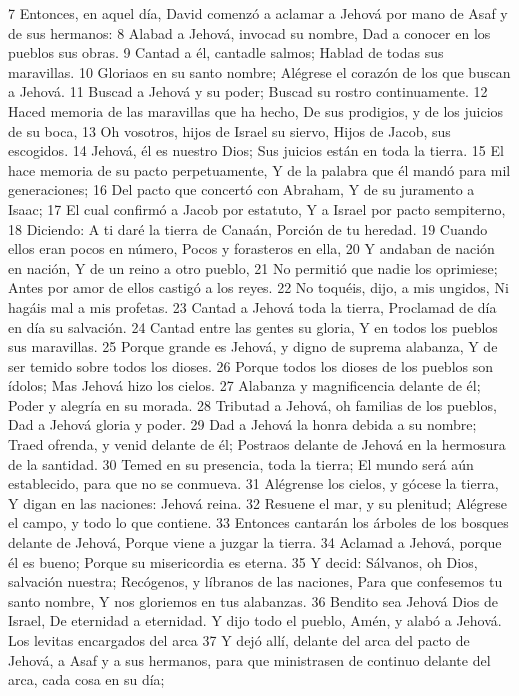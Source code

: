 7 Entonces, en aquel día, David comenzó a aclamar a Jehová por mano de Asaf y de sus hermanos:
8 Alabad a Jehová, invocad su nombre,
Dad a conocer en los pueblos sus obras.
9 Cantad a él, cantadle salmos;
Hablad de todas sus maravillas.
10 Gloriaos en su santo nombre;
Alégrese el corazón de los que buscan a Jehová. 
11 Buscad a Jehová y su poder;
Buscad su rostro continuamente.
12 Haced memoria de las maravillas que ha hecho, 
De sus prodigios, y de los juicios de su boca,
13 Oh vosotros, hijos de Israel su siervo,
Hijos de Jacob, sus escogidos. 
14 Jehová, él es nuestro Dios;
Sus juicios están en toda la tierra.
15 El hace memoria de su pacto perpetuamente,
Y de la palabra que él mandó para mil generaciones; 
16 Del pacto que concertó con Abraham, 
Y de su juramento a Isaac; 
17 El cual confirmó a Jacob por estatuto,
Y a Israel por pacto sempiterno,
18 Diciendo: A ti daré la tierra de Canaán,
Porción de tu heredad. 
19 Cuando ellos eran pocos en número,
Pocos y forasteros en ella,
20 Y andaban de nación en nación,
Y de un reino a otro pueblo,
21 No permitió que nadie los oprimiese;
Antes por amor de ellos castigó a los reyes. 
22 No toquéis, dijo, a mis ungidos,
Ni hagáis mal a mis profetas. 
23 Cantad a Jehová toda la tierra, 
Proclamad de día en día su salvación.
24 Cantad entre las gentes su gloria,
Y en todos los pueblos sus maravillas.
25 Porque grande es Jehová, y digno de suprema alabanza,
Y de ser temido sobre todos los dioses.
26 Porque todos los dioses de los pueblos son ídolos;
Mas Jehová hizo los cielos.
27 Alabanza y magnificencia delante de él;
Poder y alegría en su morada.
28 Tributad a Jehová, oh familias de los pueblos,
Dad a Jehová gloria y poder. 
29 Dad a Jehová la honra debida a su nombre;
Traed ofrenda, y venid delante de él;
Postraos delante de Jehová en la hermosura de la santidad. 
30 Temed en su presencia, toda la tierra;
El mundo será aún establecido, para que no se conmueva. 
31 Alégrense los cielos, y gócese la tierra,
Y digan en las naciones: Jehová reina.
32 Resuene el mar, y su plenitud;
Alégrese el campo, y todo lo que contiene.
33 Entonces cantarán los árboles de los bosques delante de Jehová,
Porque viene a juzgar la tierra.
34 Aclamad a Jehová, porque él es bueno;
Porque su misericordia es eterna. 
35 Y decid: Sálvanos, oh Dios, salvación nuestra;
Recógenos, y líbranos de las naciones,
Para que confesemos tu santo nombre,
Y nos gloriemos en tus alabanzas.
36 Bendito sea Jehová Dios de Israel,
De eternidad a eternidad.
Y dijo todo el pueblo, Amén, y alabó a Jehová.
Los levitas encargados del arca
37 Y dejó allí, delante del arca del pacto de Jehová, a Asaf y a sus hermanos, para que ministrasen de continuo delante del arca, cada cosa en su día;
